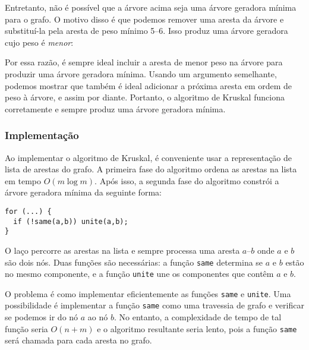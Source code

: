Entretanto, não é possível que a árvore acima
seja uma árvore geradora mínima para o grafo.
O motivo disso é que podemos remover uma aresta
da árvore e substituí-la pela aresta de peso mínimo 5--6.
Isso produz uma árvore geradora cujo peso é
\emph{menor}:

\begin{center}
\end{center}

Por essa razão, é sempre ideal 
incluir a aresta de menor peso 
na árvore para produzir uma árvore geradora mínima.
Usando um argumento semelhante, podemos mostrar que também 
é ideal adicionar a próxima aresta em ordem de peso 
à árvore, e assim por diante.
Portanto, o algoritmo de Kruskal funciona corretamente e 
sempre produz uma árvore geradora mínima.

\subsubsection{Implementação}

Ao implementar o algoritmo de Kruskal, 
é conveniente usar 
a representação de lista de arestas do grafo. 
A primeira fase do algoritmo ordena as 
arestas na lista em tempo $O(m \log m)$. 
Após isso, a segunda fase do algoritmo 
constrói a árvore geradora mínima da seguinte forma:

\begin{lstlisting}
for (...) {
  if (!same(a,b)) unite(a,b);
}
\end{lstlisting}

O laço percorre as arestas na lista 
e sempre processa uma aresta $a$--$b$
onde $a$ e $b$ são dois nós. 
Duas funções são necessárias: 
a função \texttt{same} determina 
se $a$ e $b$ estão no mesmo componente, 
e a função \texttt{unite} 
une os componentes que contêm $a$ e $b$.

O problema é como implementar eficientemente 
as funções \texttt{same} e \texttt{unite}. 
Uma possibilidade é implementar a função 
\texttt{same} como uma travessia de grafo e verificar se 
podemos ir do nó $a$ ao nó $b$. 
No entanto, a complexidade de tempo de tal função 
seria $O(n+m)$
 e o algoritmo resultante seria lento, 
pois a função \texttt{same} será chamada para cada aresta no grafo.

